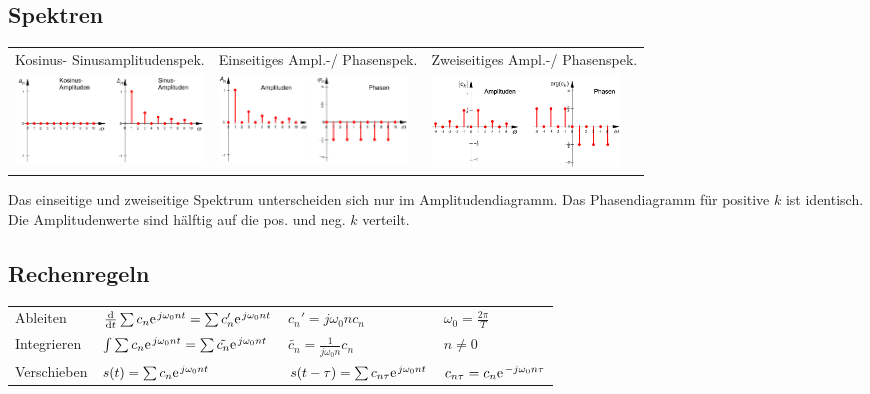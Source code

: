      	
\subsection{Spektren}

\begin{tabular}{p{}p{}p{}}
	Kosinus- Sinusamplitudenspek. & 
	Einseitiges Ampl.-/ Phasenspek. &
	Zweiseitiges Ampl.-/ Phasenspek. \\
	\includegraphics[width=5cm]{content/appendix/cosSinSpectr.png} &
	\includegraphics[width=5cm]{content/appendix/EinseitigSpectr.png} &
	\includegraphics[width=5cm]{content/appendix/ZweiseitigSpectr.png}
\end{tabular}

Das einseitige und zweiseitige Spektrum unterscheiden sich nur im
Amplitudendiagramm. Das Phasendiagramm für positive $k$ ist identisch. Die
Amplitudenwerte sind hälftig auf die pos. und neg. $k$ verteilt.

\subsection{Rechenregeln}
\begin{tabular}{p{}p{}p{}p{}}
  Ableiten & $\frac{\text{d}}{\text{d}t}\sum c_n \e^{j\omega_0 n t}=\sum c_n' \e^{j \omega_0 n t}$ & $c_n'=j\omega_0 n c_n$ & $\omega_0 = \frac{2 \pi}{T}$ \\
  Integrieren & $\int \sum c_n \e^{j\omega_0 n t} = \sum \tilde{c_{n}} \e^{j\omega_0 n t}$ & $\tilde{c_n}=\frac{1}{j\omega_0 n}c_n$ & $n\neq 0$ \\
  Verschieben & $s(t) = \sum c_n \e^{j\omega_0 n t}$ & $s(t-\tau)=\sum c_{n\tau}\e^{j\omega_0 n t}$ & $c_{n\tau}=c_n \e^{-j\omega_0 n \tau}$
\end{tabular}

